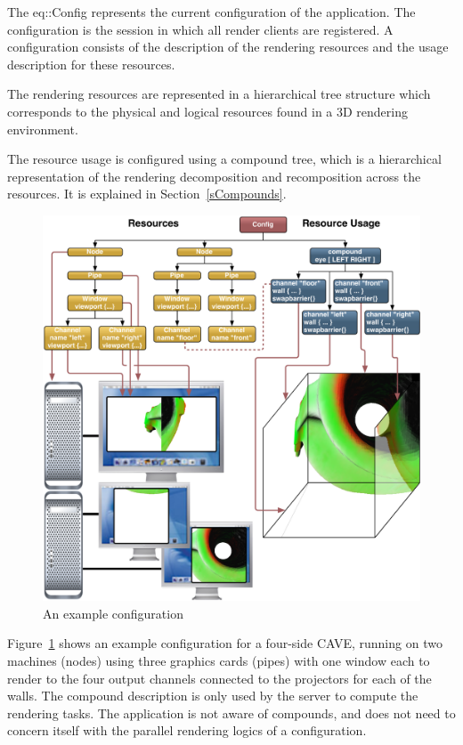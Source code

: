 \documentclass[10pt,a4]{scrartcl}
\newcommand{\fig}[1]{Figure~\ref{#1}}
\newcommand{\sref}[1]{Section~\ref{#1}}
\begin{document}
The \textsf{eq::Config} represents the current configuration of the
application. The configuration is the session in which all render
clients are registered. A configuration consists of the description of
the rendering resources and the usage description for these resources.

The rendering resources are represented in a hierarchical tree structure
which corresponds to the physical and logical resources found in a 3D
rendering environment. 

The resource usage is configured using a compound tree, which is a
hierarchical representation of the rendering decomposition and
recomposition across the resources. It is explained in \sref{sCompounds}.

\begin{figure}[ht!]\center
  \includegraphics[width=\textwidth]{images/cave.pdf}
  {\caption{\small\label{fConfig}An example configuration}}
\end{figure}

\fig{fConfig} shows an example configuration for a four-side
CAVE, running on two machines (nodes) using three graphics
cards (pipes) with one window each to render to the four output channels
connected to the projectors for each of the walls. The compound
description is only used by the server to compute the rendering
tasks. The application is not aware of compounds, and does not need to
concern itself with the parallel rendering logics of a configuration.
\end{document}
